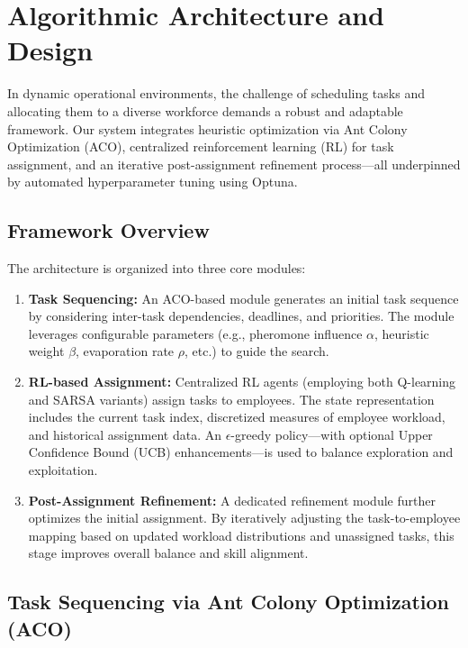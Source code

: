\documentclass[%
aip,
cp,  %
amsmath,amssymb,
reprint,%
]{revtex4-2}
\begin{document}
	\section{\label{sec:algo}Algorithmic Architecture and Design}
	
	In dynamic operational environments, the challenge of scheduling tasks and allocating them to a diverse workforce demands a robust and adaptable framework. Our system integrates heuristic optimization via Ant Colony Optimization (ACO), centralized reinforcement learning (RL) for task assignment, and an iterative post-assignment refinement process—all underpinned by automated hyperparameter tuning using Optuna.
	
	\subsection{\label{subsec:framework}Framework Overview}
	
	The architecture is organized into three core modules:
	\begin{enumerate}
		\item \textbf{Task Sequencing:} An ACO-based module generates an initial task sequence by considering inter-task dependencies, deadlines, and priorities. The module leverages configurable parameters (e.g., pheromone influence $\alpha$, heuristic weight $\beta$, evaporation rate $\rho$, etc.) to guide the search.
		\item \textbf{RL-based Assignment:} Centralized RL agents (employing both Q-learning and SARSA variants) assign tasks to employees. The state representation includes the current task index, discretized measures of employee workload, and historical assignment data. An $\epsilon$-greedy policy—with optional Upper Confidence Bound (UCB) enhancements—is used to balance exploration and exploitation.
		\item \textbf{Post-Assignment Refinement:} A dedicated refinement module further optimizes the initial assignment. By iteratively adjusting the task-to-employee mapping based on updated workload distributions and unassigned tasks, this stage improves overall balance and skill alignment.
	\end{enumerate}
	
	\subsection{\label{subsec:task-seq}Task Sequencing via Ant Colony Optimization (ACO)}
	
\end{document}
